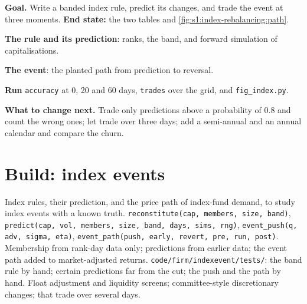 \begin{tutorial}
\textbf{Goal.} Write a banded index rule, predict its changes, and trade the event at three moments. \textbf{End state:} the two tables and
\cref{fig:s1:index-rebalancing:path}.
\begin{tutsteps}
\item \textbf{The rule and its prediction}: ranks, the band, and forward simulation of capitalisations.
\label{lst:s1:index-rebalancing:rule}
\item \textbf{The event}: the planted path from prediction to reversal.
\label{lst:s1:index-rebalancing:path}
\item \textbf{Run} \texttt{accuracy} at 0, 20 and 60 days, \texttt{trades} over the grid, and \texttt{fig\_index.py}.
\end{tutsteps}
\textbf{What to change next.} Trade only predictions above a probability of 0.8 and count the wrong ones; let  trade over three days; add a
semi-annual and an annual calendar and compare the churn.
\end{tutorial}

\section{Build: index events}\label{bld:s1:index-rebalancing:indexevent}

\begin{build}
 Index rules, their prediction, and the price path of index-fund demand, to study index events with a known truth.
 \texttt{reconstitute(cap, members, size, band)}, \texttt{predict(cap, vol, members, size, band, days, sims, rng)},
\texttt{event\_push(q, adv, sigma, eta)}, \texttt{event\_path(push, early, revert, pre, run, post)}.
 Membership from rank-day data only; predictions from earlier data; the event path added to market-adjusted returns.
 \texttt{code/firm/indexevent/tests/}: the band rule by hand; certain predictions far from the cut; the push and the path by hand.
 Float adjustment and liquidity screens; committee-style discretionary changes;  that trade over several days.
\end{build}

